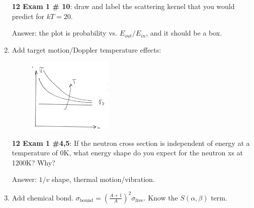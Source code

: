 \documentclass{school-22.211-notes}
\begin{document}
\begin{enumerate}
\textbf{12 Exam 1 \# 10}: draw and label the scattering kernel that you would predict for $kT = 20$. 

Answer: the plot is probability vs. $E_{out}/E_{in}$, and it should be a box. 

\item Add target motion/Doppler temperature effects: 
\begin{figure}[ht]
  \centering
  \includegraphics[width=1.6in]{images/sl-d/Doppler.png}
\end{figure}
\textbf{12 Exam 1 \#4,5}: If the neutron cross section is independent of energy at a temperature of 0K, what energy shape do you expect for the neutron xs at 1200K? Why? 

Answer: $1/v$ shape, thermal motion/vibration.

\item Add chemical bond. $\displaystyle \sigma_{\mathrm{bound}} = \left( \frac{A+1}{A} \right)^2 \sigma_{\mathrm{free}}$.   Know the $S(\alpha, \beta)$ term. 
\end{enumerate}
\end{document}
